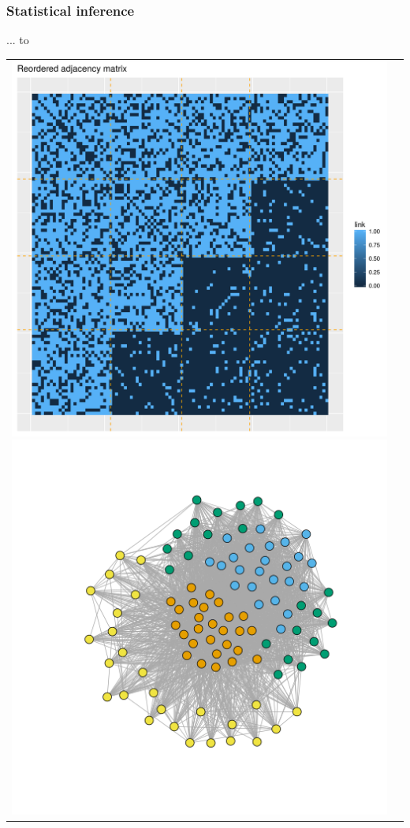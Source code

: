 \documentclass[nopagenumber,9pt]{beamer}
\begin{document}
\begin{frame}\frametitle{Statistical inference} 

... to 

\centering
\begin{tabular}{cc}
\includegraphics[scale=.2]{plots/sbm/Nested_reordered_adja_with_groups.png}
\includegraphics[scale=.2]{plots/sbm/Nested_graphe_with_colors.png}
\end{tabular}


\end{frame}
\end{document}
